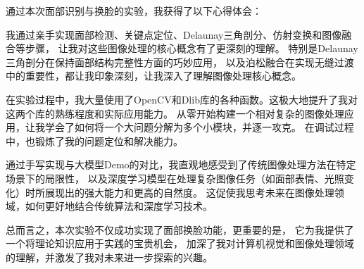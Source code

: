 通过本次面部识别与换脸的实验，我获得了以下心得体会：

我通过亲手实现面部检测、关键点定位、Delaunay三角剖分、仿射变换和图像融合等步骤，
让我对这些图像处理的核心概念有了更深刻的理解。
特别是Delaunay三角剖分在保持面部结构完整性方面的巧妙应用，
以及泊松融合在实现无缝过渡中的重要性，都让我印象深刻，让我深入了理解图像处理核心概念。


在实验过程中，我大量使用了OpenCV和Dlib库的各种函数。这极大地提升了我对这两个库的熟练程度和实际应用能力。
从零开始构建一个相对复杂的图像处理应用，让我学会了如何将一个大问题分解为多个小模块，并逐一攻克。
在调试过程中，也锻炼了我的问题定位和解决能力。

通过手写实现与大模型Demo的对比，我直观地感受到了传统图像处理方法在特定场景下的局限性，
以及深度学习模型在处理复杂图像任务（如面部表情、光照变化）时所展现出的强大能力和更高的自然度。
这促使我思考未来在图像处理领域，如何更好地结合传统算法和深度学习技术。
    
总而言之，本次实验不仅成功实现了面部换脸功能，更重要的是，
它为我提供了一个将理论知识应用于实践的宝贵机会，
加深了我对计算机视觉和图像处理领域的理解，并激发了我对未来进一步探索的兴趣。
